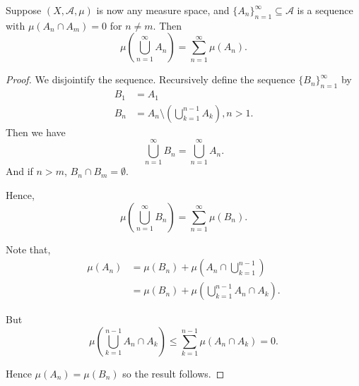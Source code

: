 \documentclass{unswmaths}
\begin{document}
\begin{lemma}
\label{almostDisjointSequence}
    Suppose $(X,\mathcal{A},\mu)$ is now any measure space,
    and $\{A_n\}_{n=1}^\infty \subseteq \mathcal{A}$ is a sequence
    with $\mu(A_n\cap A_m) = 0$ for $n\neq m$. Then 
    \begin{equation*}
        \mu\left(\bigcup_{n=1}^\infty A_n\right) = \sum_{n=1}^\infty \mu(A_n).
    \end{equation*}
\end{lemma}
\begin{proof}
    We disjointify the sequence. Recursively define the sequence $\{B_n\}_{n=1}^\infty$
    by
    \begin{align*}
        B_1 &= A_1\\
        B_n &= A_n\setminus \left(\bigcup_{k=1}^{n-1} A_k\right), n>1.
    \end{align*}
    Then we have
    \begin{equation*}
        \bigcup_{n=1}^\infty B_n = \bigcup_{n=1}^\infty A_n.
    \end{equation*}
    And if $n > m$, $B_n\cap B_m = \emptyset$.
    
    Hence,
    \begin{equation*}
        \mu\left(\bigcup_{n=1}^\infty B_n\right) = \sum_{n=1}^\infty \mu(B_n).
    \end{equation*}
    
    Note that, 
    \begin{align*}
        \mu(A_n) &= \mu(B_n) + \mu(A_n\cap\bigcup_{k=1}^{n-1})\\
        &= \mu(B_n) + \mu(\bigcup_{k=1}^{n-1} A_n\cap A_k).
    \end{align*}
    
    But
    \begin{equation*}
        \mu(\bigcup_{k=1}^{n-1} A_n\cap A_k) \leq \sum_{k=1}^{n-1} \mu(A_n\cap A_k) = 0.
    \end{equation*}
    
    Hence $\mu(A_n) = \mu(B_n)$ so the result follows.  
    
\end{proof}
\end{document}
